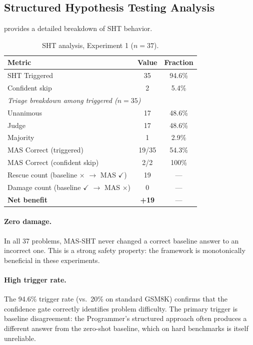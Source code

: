 \documentclass[11pt,a4paper]{article}
\begin{document}
\subsection{Structured Hypothesis Testing Analysis}
 provides a detailed breakdown of SHT behavior.
\begin{table}[h]
\centering
\caption{SHT analysis, Experiment 1 ($n=37$).}
\label{tab:sht_analysis}
\begin{tabular}{lcc}
\toprule
\textbf{Metric} & \textbf{Value} & \textbf{Fraction} \\
\midrule
SHT Triggered             & 35 & 94.6\% \\
\quad Confident skip      &  2 &  5.4\% \\
\midrule
\multicolumn{3}{l}{\textit{Triage breakdown among triggered ($n=35$)}} \\
\quad Unanimous           & 17 & 48.6\% \\
\quad Judge               & 17 & 48.6\% \\
\quad Majority            &  1 &  2.9\% \\
\midrule
MAS Correct (triggered)   & 19/35 & 54.3\% \\
MAS Correct (confident skip) & 2/2 & 100\% \\
\midrule
Rescue count (baseline $\times$ $\to$ MAS $\checkmark$) & 19 & --- \\
Damage count  (baseline $\checkmark$ $\to$ MAS $\times$) &  0 & --- \\
\textbf{Net benefit}      & \textbf{+19} & --- \\
\bottomrule
\end{tabular}
\end{table}
\paragraph{Zero damage.}
In all 37 problems, MAS-SHT never changed a correct baseline answer to an incorrect one.
This is a strong safety property: the framework is monotonically beneficial in these experiments.
\paragraph{High trigger rate.}
The 94.6\% trigger rate (vs.\ 20\% on standard GSM8K) confirms that the confidence gate correctly identifies problem difficulty.
The primary trigger is baseline disagreement: the Programmer's structured approach often produces a different answer from the zero-shot baseline, which on hard benchmarks is itself unreliable.
\end{document}
